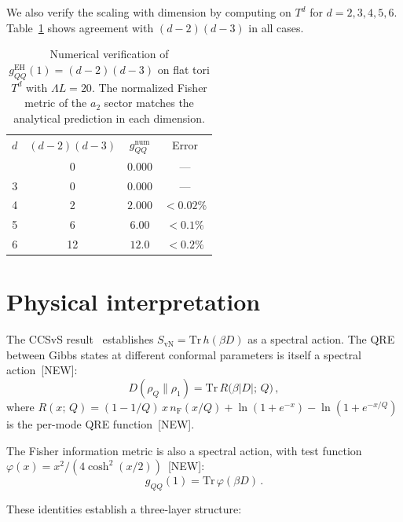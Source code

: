\documentclass[prl,twocolumn,superscriptaddress,longbibliography]{revtex4-2}
\newcommand{\Tr}{\mathrm{Tr}}
\newcommand{\nF}{n_{\mathrm{F}}}
\newcommand{\SvN}{S_{\mathrm{vN}}}
\begin{document}
We also verify the scaling with dimension by
computing on $T^d$ for $d = 2, 3, 4, 5, 6$.
Table~\ref{tab:numerical} shows agreement with
$(d-2)(d-3)$ in all cases.

\begin{table}[t]
\centering
\caption{Numerical verification of
$g_{QQ}^{\mathrm{EH}}(1) = (d-2)(d-3)$
on flat tori $T^d$ with $\Lambda L = 20$.
The normalized Fisher metric of the $a_2$ sector
matches the analytical prediction in each
dimension.}
\label{tab:numerical}
\begin{ruledtabular}
\begin{tabular}{cccc}
$d$ & $(d\!-\!2)(d\!-\!3)$ & $g_{QQ}^{\mathrm{num}}$
  & Error \\
\colrule
2 & 0 & $0.000$ & --- \\
3 & 0 & $0.000$ & --- \\
4 & 2 & $2.000$ & $<0.02\%$ \\
5 & 6 & $6.00$  & $<0.1\%$ \\
6 & 12 & $12.0$ & $<0.2\%$ \\
\end{tabular}
\end{ruledtabular}
\end{table}


\section{Physical interpretation}
\label{sec:interpretation}

The CCSvS result~\cite{CCSvS2018} establishes
$\SvN = \Tr\, h(\beta D)$ as a spectral action.
The QRE between Gibbs states at different
conformal parameters is itself a spectral
action~[NEW]:
\begin{equation}\label{eq:QRE_spectral}
  D(\rho_Q \| \rho_1)
  = \Tr\, R\bigl(\beta|D|;\, Q\bigr)\,,
\end{equation}
where $R(x;\,Q) = (1-1/Q)\,x\,\nF(x/Q)
+ \ln(1+e^{-x}) - \ln(1+e^{-x/Q})$ is the
per-mode QRE function~[NEW].

The Fisher information metric is also a spectral
action, with test function
$\varphi(x) = x^2/(4\cosh^2(x/2))$~[NEW]:
\begin{equation}\label{eq:fisher_spectral}
  g_{QQ}(1)
  = \Tr\,\varphi(\beta D)\,.
\end{equation}

These identities establish a three-layer structure:
\end{document}
